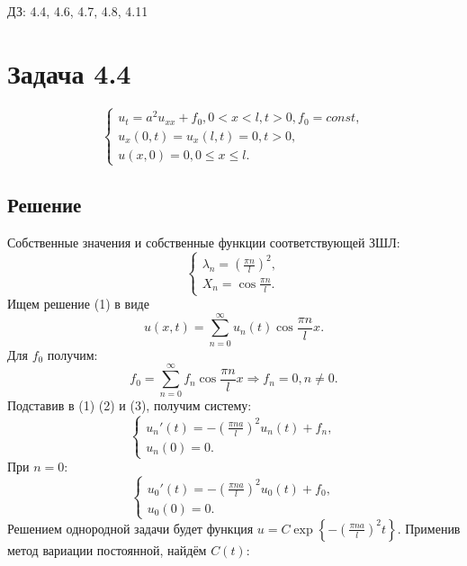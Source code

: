 \documentclass[11pt]{article}
\author{Sergey Makarov}
\date{\today}
\title{}
\def\zall{\setcounter{lem}{0}\setcounter{cnsqnc}{0}\setcounter{th}{0}\setcounter{Cmt}{0}\setcounter{equation}{0}}
\begin{document}
\zall

ДЗ: 4.4, 4.6, 4.7, 4.8, 4.11

\section{Задача 4.4}
\label{sec:orge8613b5}
\begin{equation}
\begin{cases}
u_t = a^2u_{xx} + f_0, 0 < x < l, t > 0, f_0 = const, \\
u_x(0, t) = u_x(l, t) = 0, t > 0, \\
u(x, 0) = 0, 0 \leq x \leq l.
\end{cases}
\end{equation}
\subsection{Решение}
\label{sec:org7738b40}
Собственные значения и собственные функции соответствующей ЗШЛ:
\begin{equation*}
\begin{cases}
\lambda_n = \left(\frac{\pi n}l\right)^2, \\
X_n = \cos\frac{\pi n}l.
\end{cases}
\end{equation*}
Ищем решение (1) в виде
\begin{equation}
u(x, t) = \sum_{n = 0}^{\infty}u_n(t)\cos\frac{\pi n}lx.
\end{equation}
Для $f_0$ получим:
\begin{equation}
f_0 = \sum_{n = 0}^{\infty}f_n\cos\frac{\pi n}lx \Rightarrow f_n = 0, n \neq 0.
\end{equation}
Подставив в (1) (2) и (3), получим систему:
\begin{equation*}
\begin{cases}
u_n'(t) = -\left(\frac{\pi na}l\right)^2u_n(t) + f_n, \\
u_n(0) = 0.
\end{cases}
\end{equation*}
При $n = 0$:
\begin{equation*}
\begin{cases}
u_0'(t) = -\left(\frac{\pi na}l\right)^2u_0(t) + f_0, \\
u_0(0) = 0.
\end{cases}
\end{equation*}
Решением однородной задачи будет функция $u = C\exp\left\{-\left(\frac{\pi na}l\right)^2t\right\}$. Применив
метод вариации постоянной, найдём $C(t)$:
\end{document}

